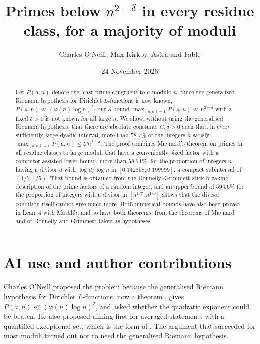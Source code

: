 \documentclass[11pt,colorlinks]{charlie}
\title{Primes below $n^{2-\delta}$ in every residue class, for a majority of moduli}
\author{Charles O'Neill, Max Kirkby, Astra and Fable}
\date{24 November 2026}
\begin{document}
\maketitle

\begin{abstract}
Let $P(a,n)$ denote the least prime congruent to $a$ modulo $n$. Since the generalised Riemann hypothesis for Dirichlet $L$-functions is now known, $P(a,n)\ll(\varphi(n)\log n)^2$, but a bound $\max_{(a,n)=1}P(a,n)\ll n^{2-\delta}$ with a fixed $\delta>0$ is not known for all large $n$. We show, without using the generalised Riemann hypothesis, that there are absolute constants $C,\delta>0$ such that, in every sufficiently large dyadic interval, more than $58.7\%$ of the integers $n$ satisfy $\max_{(a,n)=1}P(a,n)\le Cn^{2-\delta}$. The proof combines Maynard's theorem on primes in all residue classes to large moduli that have a conveniently sized factor with a computer-assisted lower bound, more than $58.71\%$, for the proportion of integers $n$ having a divisor $d$ with $\log d/\log n$ in $[0.142858,0.199999]$, a compact subinterval of $(1/7,1/5)$. That bound is obtained from the Donnelly--Grimmett stick-breaking description of the prime factors of a random integer, and an upper bound of $59.56\%$ for the proportion of integers with a divisor in $[n^{1/7},n^{1/5}]$ shows that the divisor condition itself cannot give much more. Both numerical bounds have also been proved in Lean~4 with Mathlib, and so have both theorems, from the theorems of Maynard and of Donnelly and Grimmett taken as hypotheses.
\end{abstract}

\section*{AI use and author contributions}
\aiusestatement

Charles O'Neill proposed the problem because the generalised Riemann hypothesis for Dirichlet $L$-functions, now a theorem \cite{Alpoge}, gives $P(a,n)\ll(\varphi(n)\log n)^2$, and asked whether the quadratic exponent could be beaten. He also proposed aiming first for averaged statements with a quantified exceptional set, which is the form of . The argument that succeeded for most moduli turned out not to need the generalised Riemann hypothesis. \responsibilitystatement
\end{document}
